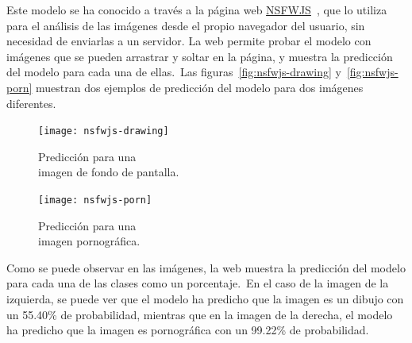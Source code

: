 Este modelo se ha conocido a través a la página web \href{https://nsfwjs.com/}{NSFWJS}~\cite{nsfwjs}, que lo utiliza
para el análisis de las imágenes desde el propio navegador del usuario, sin necesidad de enviarlas a un servidor.
La web permite probar el modelo con imágenes que se pueden arrastrar y soltar en la página, y muestra la
predicción del modelo para cada una de ellas.\ Las figuras~\ref{fig:nsfwjs-drawing} y~\ref{fig:nsfwjs-porn} muestran
dos ejemplos de predicción del modelo para dos imágenes diferentes.

\begin{figure}[H]
	\centering
	\begin{minipage}[c]{0.46\linewidth}
		\centering
		\texttt{[image: nsfwjs-drawing]}
		\caption{Predicción para una\\ imagen de fondo de pantalla.}
		\label{fig:nsfwjs-drawing}
	\end{minipage}
	\hfill
	\begin{minipage}[c]{0.46\linewidth}
		\centering
		\texttt{[image: nsfwjs-porn]}
		\caption{Predicción para una\\ imagen pornográfica.}
		\label{fig:nsfwjs-porn}
	\end{minipage}
	\label{fig:nsfwjs-example}
\end{figure}

Como se puede observar en las imágenes, la web muestra la predicción del modelo para cada una de las clases como
un porcentaje.\ En el caso de la imagen de la izquierda, se puede ver que el modelo ha predicho que la imagen es
un dibujo con un 55.40\% de probabilidad, mientras que en la imagen de la derecha, el modelo ha predicho que
la imagen es pornográfica con un 99.22\% de probabilidad.
